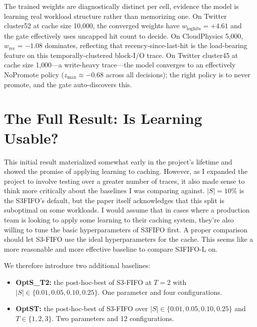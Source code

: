 \documentclass[letterpaper,twocolumn,10pt]{article}
\begin{document}
The trained weights are diagnostically distinct per cell, evidence
the model is learning real workload structure rather than
memorizing one. On Twitter cluster52 at cache size 10{,}000, the
converged weights have $w_{\log\textrm{hits}} = +4.61$ and the
gate effectively uses uncapped hit count to decide. On
CloudPhysics 5{,}000, $w_{\textrm{rec}} = -1.08$ dominates,
reflecting that recency-since-last-hit is the load-bearing
feature on this temporally-clustered block-I/O trace. On Twitter
cluster45 at cache size 1{,}000---a write-heavy trace---the
model converges to an effectively NoPromote policy
($z_{\max} \approx -0.68$ across all decisions); the right policy
is to never promote, and the gate auto-discovers this.
 
\section{The Full Result: Is Learning Usable?}
\label{sec:honest}
This initial result materialized somewhat early in the project's lifetime and showed the promise of applying learning to caching. However, as I expanded the project to involve testing over a greater number of traces, it also made sense to think more critically about the baselines I was comparing against.
$|S| = 10\%$ is the S3FIFO's default, but the paper itself
acknowledges that this split is suboptimal on some workloads. I would assume that 
in cases where a production team is looking to apply some learning to their caching system, they're also willing to tune the basic hyperparameters of S3FIFO first. A
proper comparison should let S3-FIFO use the ideal hyperparameters for the cache. This seems like a more reasonable and more effective baseline to compare S3FIFO-L on. 
 
We therefore introduce two additional baselines:
 
\begin{itemize}
\item \textbf{OptS\_T2:} the post-hoc-best of S3-FIFO at $T=2$ with
  $|S| \in \{0.01, 0.05, 0.10, 0.25\}$. One parameter and four configurations.
\item \textbf{OptST:} the post-hoc-best of S3-FIFO over $|S| \in
  \{0.01, 0.05, 0.10, 0.25\}$ and $T \in \{1, 2, 3\}$. Two parameters and 12 configurations.
\end{itemize}
 
\end{document}
